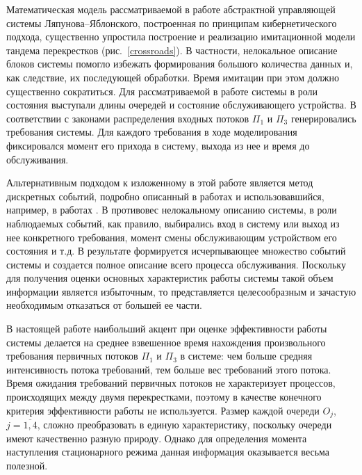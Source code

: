 
Математическая модель рассматриваемой в работе абстрактной управляющей системы Ляпунова--Яблонского, построенная по принципам кибернетического подхода, существенно упростила построение и реализацию имитационной модели тандема перекрестков (рис.~\ref{crossroads}). В частности, нелокальное описание блоков системы помогло избежать формирования большого количества данных и, как следствие, их последующей обработки. Время имитации при этом должно существенно сократиться. Для рассматриваемой в работе системы в роли состояния выступали длины очередей и состояние обслуживающего устройства. В соответствии с законами распределения входных потоков  $\Pi_1$ и $\Pi_3$ генерировались требования системы. Для каждого требования в ходе моделирования фиксировался момент его прихода в систему, выхода из нее и время до обслуживания.

Альтернативным подходом к изложенному в этой работе является метод дискретных событий, подробно описанный в работах  \cite{AsmussenGlynn,Simulation} и использовавшийся, например, в работах \cite{FedotkinRachinskaya:2016,FedotkinADissertation}. В противовес нелокальному описанию системы, в роли наблюдаемых событий, как правило, выбирались вход в систему или выход из нее конкретного требования, момент смены обслуживающим устройством его состояния и т.д. В результате формируется исчерпывающее множество событий системы и создается полное описание всего процесса обслуживания. Поскольку для получения оценки основных характеристик работы системы такой объем информации является избыточным, то представляется целесообразным и зачастую необходимым отказаться от большей ее части.

В настоящей работе наибольший акцент при оценке эффективности работы системы делается на среднее взвешенное время нахождения произвольного требования первичных потоков $\Pi_1$ и $\Pi_3$ в системе: чем больше средняя интенсивность потока требований, тем больше вес требований этого потока. Время ожидания требований первичных потоков не характеризует процессов, происходящих между двумя перекрестками, поэтому в качестве конечного критерия эффективности работы не используется. Размер каждой очереди $O_j$, $j=\overline{1,4}$, сложно преобразовать в единую характеристику, поскольку очереди имеют качественно разную природу. Однако для определения момента наступления стационарного режима данная информация оказывается весьма полезной.

